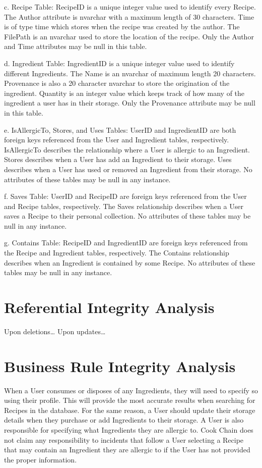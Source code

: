 \documentclass{article}
\begin{document}
c.	Recipe Table: RecipeID is a unique integer value used to identify every Recipe. The Author attribute is nvarchar with a maximum length of 30 characters. Time is of type time which stores when the recipe was created by the author. The FilePath is an nvarchar used to store the location of the recipe. Only the Author and Time attributes may be null in this table.

d.	Ingredient Table: IngredientID is a unique integer value used to identify different Ingredients. The Name is an nvarchar of maximum length 20 characters. Provenance is also a 20 character nvarchar to store the origination of the ingredient. Quantity is an integer value which keeps track of how many of the ingredient a user has in their storage. Only the Provenance attribute may be null in this table.

e.	IsAllergicTo, Stores, and Uses Tables: UserID and IngredientID are both foreign keys referenced from the User and Ingredient tables, respectively. IsAllergicTo describes the relationship where a User is allergic to an Ingredient. Stores describes when a User has add an Ingredient to their storage. Uses describes when a User has used or removed an Ingredient from their storage. No attributes of these tables may be null in any instance.

f.	Saves Table: UserID and RecipeID are foreign keys referenced from the User and Recipe tables, respectively. The Saves relationship describes when a User saves a Recipe to their personal collection. No attributes of these tables may be null in any instance.
 
g.	Contains Table: RecipeID and IngredientID are foreign keys referenced from the Recipe and Ingredient tables, respectively. The Contains relationship describes when an Ingredient is contained by some Recipe. No attributes of these tables may be null in any instance.

\section{Referential Integrity Analysis}
	Upon deletions…
	Upon updates…
\section{Business Rule Integrity Analysis}
	When a User consumes or disposes of any Ingredients, they will need to specify so using their profile. This will provide the most accurate results when searching for Recipes in the database. For the same reason, a User should update their storage details when they purchase or add Ingredients to their storage. A User is also responsible for specifying what Ingredients they are allergic to. Cook Chain does not claim any responsibility to incidents that follow a User selecting a Recipe that may contain an Ingredient they are allergic to if the User has not provided the proper information.
\newpage
{}
 
\end{document}
